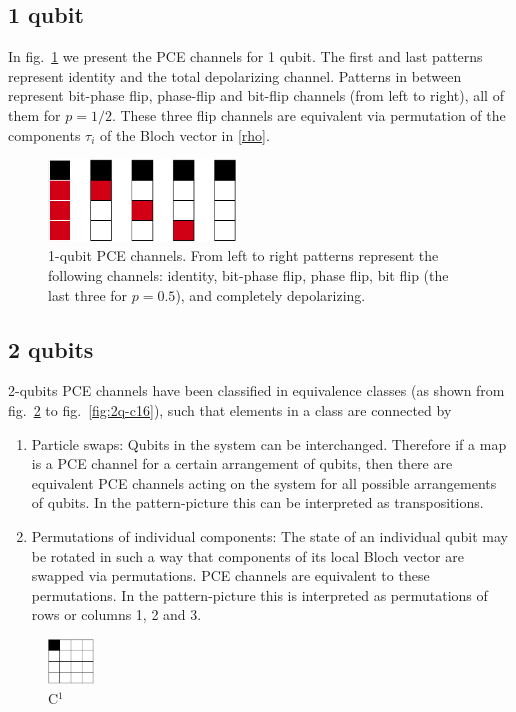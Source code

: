 \documentclass[11pt,dvipsnames]{article} %
\newcommand{\fref}[1]{fig.~\ref{#1}}  \newcommand{\tref}[1]{table~\ref{#1}}
\newcommand{\1}{\mathds{1}}
\begin{document}
\subsection*{1 qubit} %
In \fref{fig:1q-ccs} we present the PCE channels for 1 qubit.
The first and last patterns represent identity 
and the total depolarizing channel. 
Patterns in between represent 
bit-phase flip, phase-flip and bit-flip channels (from left to right), 
all of them for $p=1/2$.	
These three flip channels are equivalent via permutation
of the components $\tau_i$ of the Bloch vector in \eqref{rho}.
\begin{figure}[H]%
	\centering
	\includegraphics[width=5cm]
	{img/1q-CCs.png}
	\caption{
1-qubit PCE channels. From left to right patterns represent  
the following channels: identity,
bit-phase flip, phase flip, bit flip (the last three for 
$p=0.5$), and completely depolarizing.}
	\label{fig:1q-ccs}
\end{figure} %
\subsection*{2 qubits} %
2-qubits PCE channels have been classified in equivalence classes 
(as shown from \fref{fig:2q-c1} to \fref{fig:2q-c16}), such
that elements in a class are connected by
\begin{enumerate}
	\item Particle swaps: Qubits in the system can be interchanged. Therefore
	if a map is a PCE channel for a certain arrangement 
	of qubits, then
	there are equivalent PCE channels acting on the system for all possible
	arrangements of qubits. In the pattern-picture this can be
	interpreted as transpositions.
	\item Permutations of individual components: The state of an individual
	qubit may be rotated in such a way that components of its local Bloch
	vector are swapped via permutations. PCE channels are equivalent
	to these permutations.
	In the pattern-picture this
	is interpreted as permutations of rows or columns 1, 2 and 3.
\end{enumerate}

\begin{figure}[H] %
	\centering
  \includegraphics[height=1.2cm]
	{img/C16.png}
	\caption{C${}^{1}$}
	\label{fig:2q-c1}
\end{figure} %
\end{document}
